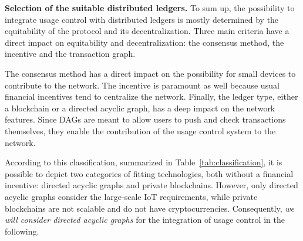  
 \textbf{Selection of the suitable distributed ledgers.} 
 To sum up, the possibility to integrate usage control with distributed ledgers is mostly determined by the equitability of the protocol and its decentralization. Three main criteria have a direct impact on equitability and decentralization: the consensus method, the incentive and the transaction graph.
 
 The consensus method has a direct impact on the possibility for small devices to contribute to the network. The incentive is paramount as well because usual financial incentives tend to centralize the network. Finally, the ledger type, either a blockchain or a directed acyclic graph, has a deep impact on the network features. Since DAGs are meant to allow users to push and check transactions themselves, they enable the contribution of the usage control system to the network.
 
  According to this classification, summarized in Table~\ref{tab:classification}, it is possible to depict two categories of fitting technologies, both without a financial incentive: directed acyclic graphs and private blockchains. However, only directed acyclic graphs consider the large-scale IoT requirements, while private blockchains are not scalable and do not have cryptocurrencies. Consequently, \emph{we will consider directed acyclic graphs} for the integration of usage control in the following. 

